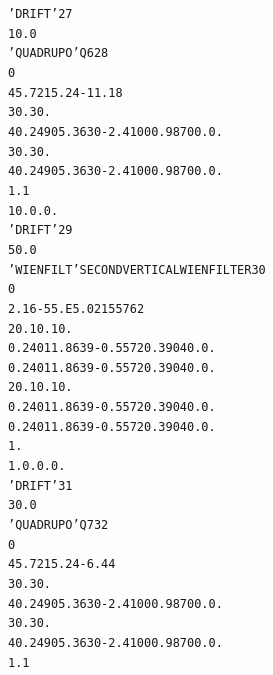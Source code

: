 \begin{tiny}
\begin{alltt}
   'DRIFT'                                                                27
     10.0                                                                       
   'QUADRUPO'                            Q6                               28
   0                                                        
    45.72  15.24  -11.18                                                        
    30. 30.                                                                     
    4    0.2490   5.3630  -2.4100   0.9870   0.   0.                            
    30. 30.                                                                     
    4    0.2490   5.3630  -2.4100   0.9870   0.   0.                            
     1.1                                                                        
    1  0. 0. 0.                                                                 
   'DRIFT'                                                                29
     50.0                                                                       
    'WIENFILT'                         SECOND  VERTICAL  WIEN  FILTER     30
    0                                                       
   2.16  -55.E5  .0215576  2                                                    
   20. 10. 10.                                                                  
   0.2401  1.8639  -0.5572  0.3904 0. 0.                                        
   0.2401  1.8639  -0.5572  0.3904 0. 0.                                        
   20. 10. 10.                                                                  
   0.2401  1.8639  -0.5572  0.3904 0. 0.                                        
   0.2401  1.8639  -0.5572  0.3904 0. 0.                                        
   1.                                                       
  1. 0. 0. 0.                                                                   
   'DRIFT'                                                                31
     30.0                                                                       
   'QUADRUPO'                            Q7                               32
   0                                                        
    45.72  15.24  -6.44                                                         
    30. 30.                                                                     
    4    0.2490   5.3630  -2.4100   0.9870   0.   0.                            
    30. 30.                                                                     
    4    0.2490   5.3630  -2.4100   0.9870   0.   0.                            
    1.1                                                                         

\end{alltt}
\end{tiny}
